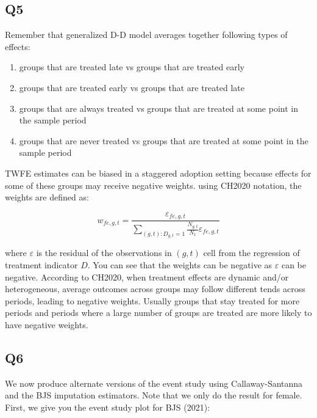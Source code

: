 \documentclass[
  letterpaper,
  DIV=11,
  numbers=noendperiod]{scrartcl}
\begin{document}
\subsection{Q5}\label{q5}

Remember that generalized D-D model averages together following types of
effects:

\begin{enumerate}
\def\labelenumi{\arabic{enumi}.}
\item
  groups that are treated late vs groups that are treated early
\item
  groups that are treated early vs groups that are treated late
\item
  groups that are always treated vs groups that are treated at some
  point in the sample period
\item
  groups that are never treated vs groups that are treated at some point
  in the sample period
\end{enumerate}

TWFE estimates can be biased in a staggered adoption setting because
effects for some of these groups may receive negative weights. using
CH2020 notation, the weights are defined as:

\[
 w_{fe,g,t} = \frac{\varepsilon_{fe,g,t}}{\sum_{(g,t): D_{g,t}=1} \frac{N_{g,t}}{N_1} \varepsilon_{fe,g,t}}
\]

where \(\varepsilon\) is the residual of the observations in \((g,t)\)
cell from the regression of treatment indicator \(D\). You can see that
the weights can be negative as \(\varepsilon\) can be negative.
According to CH2020, when treatment effects are dynamic and/or
heterogeneous, average outcomes across groups may follow different tends
across periods, leading to negative weights. Usually groups that stay
treated for more periods and periods where a large number of groups are
treated are more likely to have negative weights.

\subsection{Q6}\label{q6}

We now produce alternate versions of the event study using
Callaway-Santanna and the BJS imputation estimators. Note that we only
do the result for female. First, we give you the event study plot for
BJS (2021):
\end{document}
